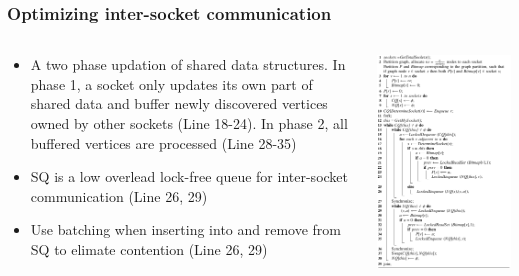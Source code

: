 \documentclass[]{beamer}
\begin{document}
\begin{frame}
  \frametitle{Optimizing inter-socket communication}
  \begin{columns}
    \begin{column}{.55\textwidth}
      \begin{itemize}
        \item A two phase updation of shared data structures.
          In phase 1, a socket only updates its own part of shared data and
          buffer newly discovered vertices owned by other sockets (Line 18-24).
          In phase 2, all buffered vertices are processed (Line 28-35)
        \item SQ is a low overlead lock-free queue for inter-socket communication (Line 26, 29)
        \item Use batching when inserting into and remove from SQ to elimate contention (Line 26, 29)
      \end{itemize}
    \end{column}
    \begin{column}{.45\textwidth}
      \includegraphics[width=\textwidth]{figures/sc10-algo3}
    \end{column}
  \end{columns}
\end{frame}
\end{document}
